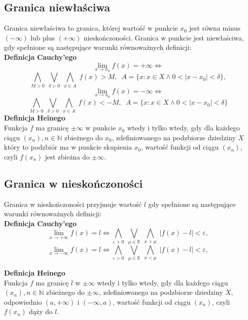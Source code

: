 \documentclass[14pt,a4paper]{extarticle}
\begin{document}
\subsection{Granica niewłaściwa}
Granica niewłaściwa to granica, której wartość w punkcie $x_{0}$ jest równa minus $(-\infty)$ lub plus $(+\infty)$ nieskończoności.
Granica w punkcie jest niewłaściwa, gdy spełnione są następujące warunki równoważnych definicji:\\

\noindent\textbf{Definicja Cauchy'ego}
$$\lim_{x\to x_{0}} f(x) = +\infty \Leftrightarrow $$
$$\underset{M > 0}{\bigwedge} \;\underset{\delta > 0}{\bigvee} \; \underset{x \in A}{\bigwedge} \; f(x) > M, \;\; A = \{x:x\in X \land 0 < \vert x - x_{0}\vert < \delta\},$$
$$\lim_{x\to x_{0}} f(x) = -\infty \Leftrightarrow $$
$$\underset{M > 0}{\bigwedge} \;\underset{\delta > 0}{\bigvee} \; \underset{x \in A}{\bigwedge} \; f(x) < -M, \;\; A = \{x:x\in X \land 0 < \vert x - x_{0}\vert < \delta\}$$
\noindent\textbf{Definicja Heinego}\\
Funkcja $f$ ma granicę $\pm\infty$ w punkcie $x_{0}$ wtedy i tylko wtedy,
gdy dla każdego ciągu $(x_{n}), n \in \mathbb{N}$ zbieżnego do $x_{0}$, zdefiniowanego na podzbiorze dziedziny $X$ który
to podzbiór ma w punkcie skupienia $x_{0}$, wartość funkcji od ciągu $(x_{n})$, czyli $f(x_{n})$ jest zbieżna do $\pm\infty$.


\subsection{Granica w nieskończoności}
Granica w nieskończoności przyjmuje wartość $l$ gdy spełnione są następujące warunki równoważnych definicji:\\

\noindent\textbf{Definicja Cauchy'ego}
$$\lim_{x\to +\infty} f(x) = l \Leftrightarrow \underset{\varepsilon > 0}{\bigwedge} \;\underset{\mu \in \mathbb{R}}{\bigvee} \; \underset{x > \mu}{\bigwedge} \; \vert f(x) - l \vert < \varepsilon,$$
\nopagebreak[4]
$$\lim_{x\to -\infty} f(x) = l \Leftrightarrow \underset{\varepsilon > 0}{\bigwedge} \;\underset{\mu \in \mathbb{R}}{\bigvee} \; \underset{x < \mu}{\bigwedge} \; \vert f(x) - l \vert < \varepsilon,$$

\noindent\textbf{Definicja Heinego}\\
Funkcja $f$ ma granicę $l$ w $\pm\infty$ wtedy i tylko wtedy,
gdy dla każdego ciągu $(x_{n}), n \in \mathbb{N}$ zbieżnego do $\pm\infty$, zdefiniowanego na podzbiorze dziedziny $X$, 
odpowiednio $(a, +\infty)$ i $(-\infty, a)$, wartość funkcji od ciągu $(x_{n})$, czyli $f(x_{n})$ dąży do $l$.\\\\
\end{document}
